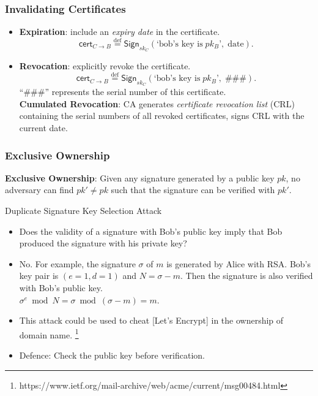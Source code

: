 \begin{frame}\frametitle{Invalidating Certificates}
\begin{itemize}
\item \textbf{Expiration}: include an \emph{expiry date} in the certificate.
\[\mathsf{cert}_{C \to B} \overset{\text{def}}{=} \mathsf{Sign}_{sk_C}(\text{`bob's key is}\; pk_B \text{'},\; \text{date}). \]
\item \textbf{Revocation}: explicitly revoke the certificate.
\[\mathsf{cert}_{C \to B} \overset{\text{def}}{=} \mathsf{Sign}_{sk_C}(\text{`bob's key is}\; pk_B \text{'},\; \text{\#\#\#}).  \]
``\#\#\#'' represents the serial number of this certificate.\\
\textbf{Cumulated Revocation}: CA generates \emph{certificate revocation list} (CRL) containing the serial numbers of all revoked certificates, signs CRL with the current date. 
\end{itemize}
\end{frame}
\begin{frame}\frametitle{Exclusive Ownership}
\textbf{Exclusive Ownership}: Given any signature generated by a public key $pk$, no adversary can find $pk' \neq pk$ such that the signature can be verified with $pk'$.
\begin{exampleblock}{Duplicate Signature Key Selection Attack}
\begin{itemize}
\item Does the validity of a signature with Bob's public key imply that Bob produced the signature with his private key?
\item No. For example, the signature $\sigma$ of $m$ is generated by Alice with RSA. Bob's key pair is $(e=1, d=1)$ and $N = \sigma - m$.
Then the signature is also verified with Bob's public key.\\
$\sigma^e \bmod N = \sigma \bmod (\sigma - m) = m$.
\item This attack could be used to cheat [Let's Encrypt] in the ownership of domain name.
\footnote{https://www.ietf.org/mail-archive/web/acme/current/msg00484.html}
\item Defence: Check the public key before verification.
\end{itemize}
\end{exampleblock}
\end{frame}
